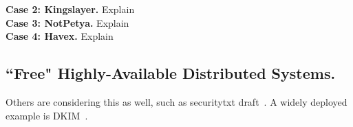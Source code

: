 \noindent\textbf{Case 2: Kingslayer.} Explain \\

\noindent\textbf{Case 3: NotPetya.} Explain \\

\noindent\textbf{Case 4: Havex.} Explain \\

\subsection{``Free" Highly-Available Distributed Systems.}

Others are considering this as well, such as securitytxt
draft~\cite{draft-sectxt}. A widely deployed example is DKIM~\cite{DKIM}.
